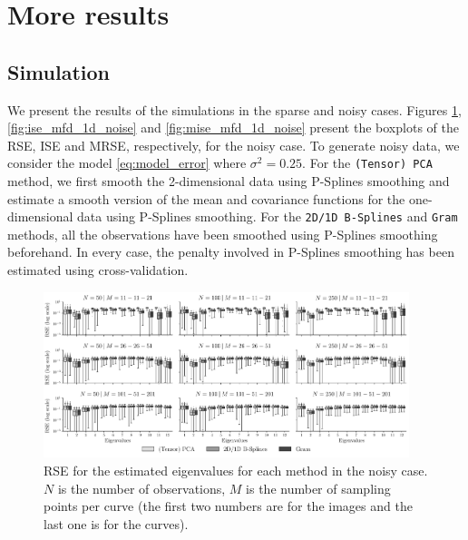\section{More results} %
\label{sec:more_results}


\subsection{Simulation} %
\label{sub:simulation}

We present the results of the simulations in the sparse and noisy cases. Figures \ref{fig:logAE_mfd_1d_noise}, \ref{fig:ise_mfd_1d_noise} and \ref{fig:mise_mfd_1d_noise} present the boxplots of the RSE, ISE and MRSE, respectively, for the noisy case. To generate noisy data, we consider the model \eqref{eq:model_error} where $\sigma^2 = 0.25$. For the \texttt{(Tensor) PCA} method, we first smooth the 2-dimensional data using P-Splines smoothing and estimate a smooth version of the mean and covariance functions for the one-dimensional data using P-Splines smoothing. For the \texttt{2D/1D B-Splines} and \texttt{Gram} methods, all the observations have been smoothed using P-Splines smoothing beforehand. In every case, the penalty involved in P-Splines smoothing has been estimated using cross-validation.

\begin{figure}
    \centering
    \includegraphics[width=0.95\textwidth]{figures/AE_noise}
    \caption{RSE for the estimated eigenvalues for each method in the noisy case. $N$ is the number of observations, $M$ is the number of sampling points per curve (the first two numbers are for the images and the last one is for the curves).}
    \label{fig:logAE_mfd_1d_noise}
\end{figure}

